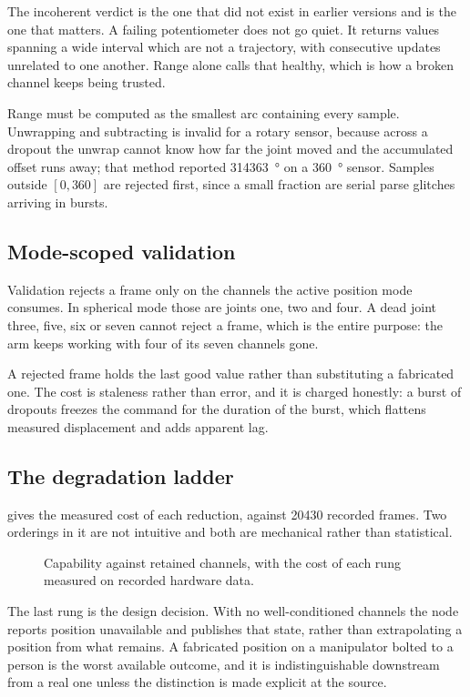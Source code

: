 The incoherent verdict is the one that did not exist in earlier versions and
is the one that matters. A failing potentiometer does not go quiet. It returns
values spanning a wide interval which are not a trajectory, with consecutive
updates unrelated to one another. Range alone calls that healthy, which is how
a broken channel keeps being trusted.

Range must be computed as the smallest arc containing every sample. Unwrapping
and subtracting is invalid for a rotary sensor, because across a dropout the
unwrap cannot know how far the joint moved and the accumulated offset runs
away; that method reported \SI{314363}{\degree} on a \SI{360}{\degree} sensor.
Samples outside $[0, 360]$ are rejected first, since a small fraction are
serial parse glitches arriving in bursts.

\subsection{Mode-scoped validation}

Validation rejects a frame only on the channels the active position mode
consumes. In spherical mode those are joints one, two and four. A dead joint
three, five, six or seven cannot reject a frame, which is the entire purpose:
the arm keeps working with four of its seven channels gone.

A rejected frame holds the last good value rather than substituting a
fabricated one. The cost is staleness rather than error, and it is charged
honestly: a burst of dropouts freezes the command for the duration of the
burst, which flattens measured displacement and adds apparent lag.

\subsection{The degradation ladder}

 gives the measured cost of each reduction, against
\num{20430} recorded frames. Two orderings in it are not intuitive and both
are mechanical rather than statistical.

\begin{figure}[htbp]
  \centering
  
  \caption[Degradation ladder]{Capability against retained channels, with the
  cost of each rung measured on recorded hardware data.}
  \label{fig:degradation}
\end{figure}

The last rung is the design decision. With no well-conditioned channels the
node reports position unavailable and publishes that state, rather than
extrapolating a position from what remains. A fabricated position on a
manipulator bolted to a person is the worst available outcome, and it is
indistinguishable downstream from a real one unless the distinction is made
explicit at the source.

